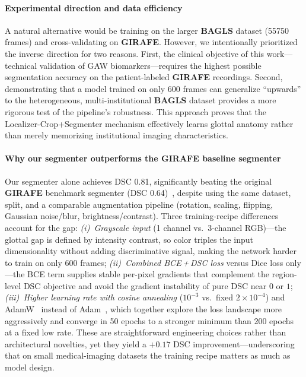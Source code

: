 \documentclass[preprint,12pt]{elsarticle}
\newcommand{\girafe}{\textbf{GIRAFE}}
\newcommand{\bagls}{\textbf{BAGLS}}
\newcommand{\yolocrop}{Localizer-Crop+Segmenter}
\newcommand{\gaw}{GAW}
\begin{document}
\paragraph{Experimental direction and data efficiency}
A natural alternative would be training on the larger \bagls{} dataset
(\num{55750} frames) and cross-validating on \girafe{}.
However, we intentionally prioritized the inverse direction for two reasons.
First, the clinical objective of this work---technical validation of \gaw{}
biomarkers---requires the highest possible segmentation accuracy on the
patient-labeled \girafe{} recordings.
Second, demonstrating that a model trained on only \num{600} frames can
generalize ``upwards'' to the heterogeneous, multi-institutional \bagls{}
dataset provides a more rigorous test of the pipeline's robustness.
This approach proves that the \yolocrop{} mechanism effectively learns
glottal anatomy rather than merely memorizing institutional imaging
characteristics.

\paragraph{Why our segmenter outperforms the \girafe{} baseline segmenter}
Our segmenter alone achieves DSC \num{0.81}, significantly beating the
original \girafe{} benchmark segmenter (DSC \num{0.64})~\cite{andrade2025datainbrief}, despite using the
same dataset, split, and a comparable augmentation pipeline (rotation,
scaling, flipping, Gaussian noise/blur, brightness/contrast).
Three training-recipe differences account for the gap:
\emph{(i)~Grayscale input} (1 channel vs.\ 3-channel RGB)---the glottal gap
is defined by intensity contrast, so color triples the input dimensionality
without adding discriminative signal, making the network harder to train on
only \num{600} frames;
\emph{(ii)~Combined BCE\,+\,DSC loss} versus Dice loss only---the BCE term
supplies stable per-pixel gradients that complement the region-level DSC
objective and avoid the gradient instability of pure DSC near $0$ or $1$;
\emph{(iii)~Higher learning rate with cosine annealing}
($10^{-3}$ vs.\ fixed $2{\times}10^{-4}$) and
AdamW~\cite{loshchilov2019adamw} instead of Adam~\cite{kingma2015adam},
which together explore the loss landscape more aggressively and converge in
\num{50} epochs to a stronger minimum than \num{200} epochs at a fixed low
rate.
These are straightforward engineering choices rather than architectural
novelties, yet they yield a $+0.17$ DSC improvement---underscoring that on
small medical-imaging datasets the training recipe matters as much as model
design.
\end{document}
